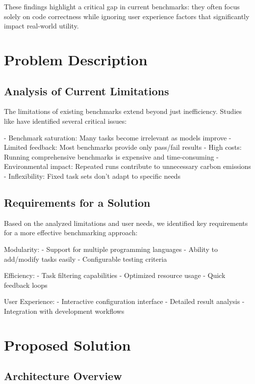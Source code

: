 These findings highlight a critical gap in current benchmarks: they often focus solely on code correctness while ignoring user experience factors that significantly impact real-world utility.

\chapter{Problem Description}

\section{Analysis of Current Limitations}

The limitations of existing benchmarks extend beyond just inefficiency. Studies like \cite{vendrow2025largelanguagemodelbenchmarks} have identified several critical issues:

- Benchmark saturation: Many tasks become irrelevant as models improve
- Limited feedback: Most benchmarks provide only pass/fail results
- High costs: Running comprehensive benchmarks is expensive and time-consuming
- Environmental impact: Repeated runs contribute to unnecessary carbon emissions
- Inflexibility: Fixed task sets don't adapt to specific needs

\section{Requirements for a Solution}

Based on the analyzed limitations and user needs, we identified key requirements for a more effective benchmarking approach:

Modularity:
- Support for multiple programming languages
- Ability to add/modify tasks easily
- Configurable testing criteria

Efficiency:
- Task filtering capabilities
- Optimized resource usage
- Quick feedback loops

User Experience:
- Interactive configuration interface
- Detailed result analysis
- Integration with development workflows

\chapter{Proposed Solution}

\section{Architecture Overview}


